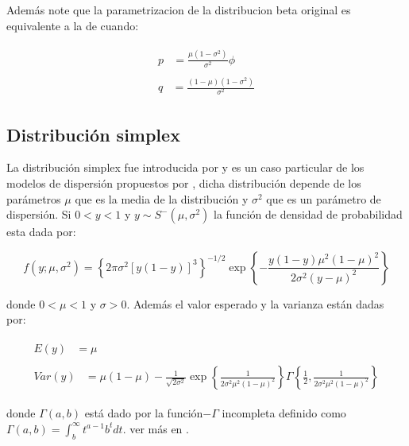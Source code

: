 Adem\'{a}s note que la parametrizacion de la distribucion beta original es equivalente a la de \cite{Stasinopoulos2} cuando:

\begin{align}
\begin{split}
	p &= \frac{\mu(1-\sigma^2)}{\sigma^2} \phi
\end{split} \label{RS_Origin1} \\
\begin{split}
q &= \frac{(1-\mu)(1-\sigma^2)}{\sigma^2} 
\end{split} \label{RS_Origin2}
\end{align}

\subsection{Distribuci\'{o}n simplex}

La distribuci\'{o}n simplex fue introducida por \cite{Barndorff1} y es un caso particular de los modelos de dispersi\'{o}n propuestos por \cite{Jorgensen1}, dicha distribuci\'{o}n depende de los par\'{a}metros $\mu$ que es la media de la distribuci\'{o}n y $\sigma^2$ que es un par\'{a}metro de dispersi\'{o}n. Si $0<y<1$ y $y \sim S^{-}(\mu, \sigma^2)$ la funci\'{o}n de densidad de probabilidad esta dada por:

\begin{equation}
f(y;\mu,\sigma^2)=\left\{2\pi\sigma^2[y(1-y)]^3\right\}^{-1/2}\exp\left\{-\frac{y(1-y)\mu^2(1-\mu)^2}{2\sigma^2(y-\mu)^2}\right\}
\end{equation}

donde $0<\mu<1$ y $\sigma>0$. Adem\'{a}s el valor esperado y la varianza est\'{a}n dadas por:

\begin{align}
\begin{split}
	E(y) &= \mu 
\end{split} \label{E_Simplex} \\
\begin{split}
	Var(y) &= \mu(1-\mu)-\frac{1}{\sqrt{2\sigma^2}}\exp\left\{\frac{1}{2\sigma^2\mu^2(1-\mu)^2}\right\}\Gamma\left\{\frac{1}{2},\frac{1}{2\sigma^2\mu^2(1-\mu)^2}\right\}
\end{split} \label{V_Simplex}
\end{align}

donde $\Gamma(a,b)$ est\'{a} dado por la funci\'{o}n$-\Gamma$ incompleta definido como $\Gamma(a,b)=\int_{b}^{\infty}{t^{a-1}b^tdt}$. ver m\'{a}s en \cite{Zhang1}.

